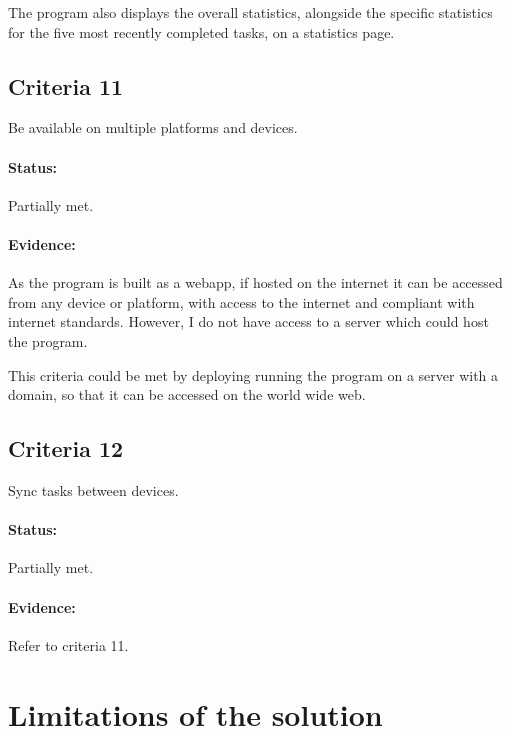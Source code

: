 \documentclass{article}
\begin{document}
The program also displays the overall statistics,
alongside the specific statistics for the five most recently completed tasks,
on a statistics page.

\subsection{Criteria 11}
Be available on multiple platforms and devices.

\paragraph{Status:}
Partially met.

\paragraph{Evidence:}
As the program is built as a webapp,
if hosted on the internet it can be accessed from any device or platform,
with access to the internet and compliant with internet standards.
However, I do not have access to a server which could host the program.

This criteria could be met by deploying running the program on a server with a domain,
so that it can be accessed on the world wide web.

\subsection{Criteria 12}
Sync tasks between devices.

\paragraph{Status:}
Partially met.

\paragraph{Evidence:}
Refer to criteria 11.

\section{Limitations of the solution}
\end{document}
